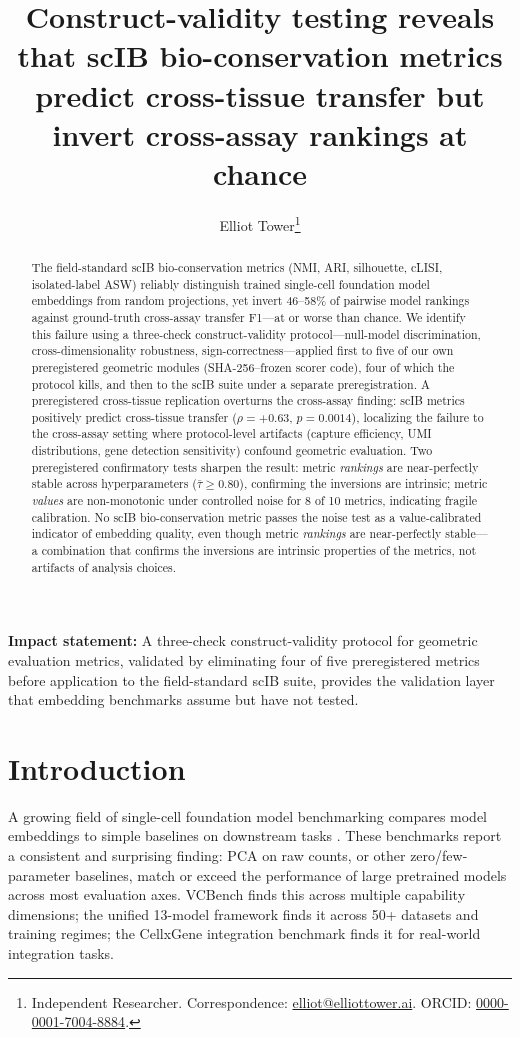 \documentclass[10pt,letterpaper]{article}
\title{Construct-validity testing reveals that scIB bio-conservation metrics predict cross-tissue transfer but invert cross-assay rankings at chance}
\author{Elliot Tower\thanks{Independent Researcher. Correspondence: \href{mailto:elliot@elliottower.ai}{elliot@elliottower.ai}. ORCID: \href{https://orcid.org/0000-0001-7004-8884}{0000-0001-7004-8884}.}}
\begin{document}
\maketitle

\begin{abstract}
The field-standard scIB bio-conservation metrics (NMI, ARI, silhouette, cLISI, isolated-label ASW) reliably distinguish trained single-cell foundation model embeddings from random projections, yet invert 46--58\% of pairwise model rankings against ground-truth cross-assay transfer F1---at or worse than chance. We identify this failure using a three-check construct-validity protocol---null-model discrimination, cross-dimensionality robustness, sign-correctness---applied first to five of our own preregistered geometric modules (SHA-256--frozen scorer code), four of which the protocol kills, and then to the scIB suite under a separate preregistration. A preregistered cross-tissue replication overturns the cross-assay finding: scIB metrics positively predict cross-tissue transfer ($\rho = +0.63$, $p = 0.0014$), localizing the failure to the cross-assay setting where protocol-level artifacts (capture efficiency, UMI distributions, gene detection sensitivity) confound geometric evaluation. Two preregistered confirmatory tests sharpen the result: metric \emph{rankings} are near-perfectly stable across hyperparameters ($\bar{\tau} \geq 0.80$), confirming the inversions are intrinsic; metric \emph{values} are non-monotonic under controlled noise for 8 of 10 metrics, indicating fragile calibration. No scIB bio-conservation metric passes the noise test as a value-calibrated indicator of embedding quality, even though metric \emph{rankings} are near-perfectly stable---a combination that confirms the inversions are intrinsic properties of the metrics, not artifacts of analysis choices.
\end{abstract}

\noindent\textbf{Impact statement:} A three-check construct-validity protocol for geometric evaluation metrics, validated by eliminating four of five preregistered metrics before application to the field-standard scIB suite, provides the validation layer that embedding benchmarks assume but have not tested.


\section{Introduction}

A growing field of single-cell foundation model benchmarking compares model embeddings to simple baselines on downstream tasks \citep{luecken2022scib, wu2025scfm, vcbench2026, unifiedscfm2026, cellxgeneintegration2026}. These benchmarks report a consistent and surprising finding: PCA on raw counts, or other zero/few-parameter baselines, match or exceed the performance of large pretrained models across most evaluation axes. VCBench \citep{vcbench2026} finds this across multiple capability dimensions; the unified 13-model framework \citep{unifiedscfm2026} finds it across 50+ datasets and training regimes; the CellxGene integration benchmark \citep{cellxgeneintegration2026} finds it for real-world integration tasks.
\end{document}
